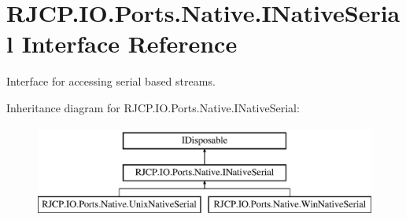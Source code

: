 \hypertarget{interface_r_j_c_p_1_1_i_o_1_1_ports_1_1_native_1_1_i_native_serial}{}\section{R\+J\+C\+P.\+I\+O.\+Ports.\+Native.\+I\+Native\+Serial Interface Reference}
\label{interface_r_j_c_p_1_1_i_o_1_1_ports_1_1_native_1_1_i_native_serial}


Interface for accessing serial based streams.  


Inheritance diagram for R\+J\+C\+P.\+I\+O.\+Ports.\+Native.\+I\+Native\+Serial\+:\begin{figure}[H]
\begin{center}
\leavevmode
\includegraphics[height=3.000000cm]{interface_r_j_c_p_1_1_i_o_1_1_ports_1_1_native_1_1_i_native_serial}
\end{center}
\end{figure}

